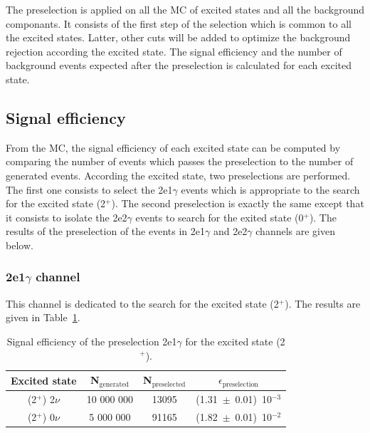 \documentclass[main.tex]{subfiles}
\begin{document}
\bigskip


\NI The preselection is applied on all the MC of excited states and all the background componants. It consists of the first step of the selection which is common to all the excited states. Latter, other cuts will be added to optimize the background rejection according the excited state. The signal efficiency and the number of background events expected after the preselection is calculated for each excited state.


\subsection{Signal efficiency}

 
\NI From the MC, the signal efficiency of each excited state can be computed by comparing the number of events which passes the preselection to the number of generated events. According the excited state, two preselections are performed. The first one consists to select the 2e1$\gamma$ events which is appropriate to the search for the excited state (2$^+$). The second preselection is exactly the same except that it consists to isolate the 2e2$\gamma$ events to search for the exited state (0$^+$). The results of the preselection of the events in 2e1$\gamma$ and 2e2$\gamma$ channels are given below. 


\subsubsection{2e1$\gamma$ channel}


\NI This channel is dedicated to the search for the excited state (2$^+$). The results are given in Table~\ref{EffPreselection2PLUS}.


\begin{table}[h!]
\begin{center}
\begin{tabular}{c|c|c|c}
\toprule
Excited state & N$_\text{{generated}}$ & N$_\text{{preselected}}$ & $\epsilon_\text{{preselection}}$ \\[0.1cm]
\midrule
(2$^+$) 2$\nu$ &  10 000 000 & 13095 & (1.31~$\pm$~0.01)~10$^{-\text{3}}$\\[0.1cm]
(2$^+$) 0$\nu$ &   5 000 000 & 91165 & (1.82~$\pm$~0.01)~10$^{-\text{2}}$\\[0.1cm]
\bottomrule
\end{tabular}
\caption{Signal efficiency of the preselection 2e1$\gamma$ for the excited state (2$^+$).}
\label{EffPreselection2PLUS}
\end{center}
\end{table}
\end{document}
